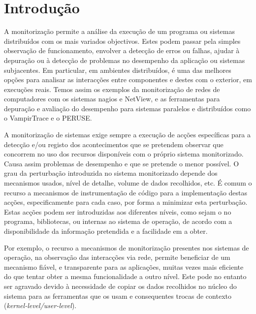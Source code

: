 \documentclass[a4paper]{llncs}
\begin{document}
\section{Introdução}
\label{sec:introduction}

A monitorização permite a análise da execução de um programa ou sistemas distribuídos com os mais variados objectivos. Estes podem passar pela simples observação de funcionamento, envolver a detecção de erros ou falhas, ajudar à depuração ou à detecção de problemas no desempenho da aplicação ou sistemas subjacentes. Em particular, em ambientes distribuídos, é uma das melhores opções para analisar as interacções entre componentes e destes com o exterior, em execuções reais. 
Temos assim os exemplos da monitorização de redes de computadores com os sistemas  nagios e NetView, e as ferramentas para depuração e avaliação do desempenho para sistemas paralelos e distribuídos como o VampirTrace e o PERUSE.




A monitorização de sistemas exige sempre a execução de acções específicas para a detecção e/ou registo dos acontecimentos que se pretendem observar que concorrem no uso dos recursos disponíveis com o próprio sistema monitorizado. Causa assim problemas de desempenho e que se pretende o menor possível. O grau da perturbação introduzida no sistema monitorizado depende dos mecanismos usados, nível de detalhe, volume de dados recolhidos, etc.  
É comum o recurso a mecanismos de instrumentação de código para a implementação destas acções, especificamente para cada caso, por forma a minimizar esta perturbação. Estas acções podem ser introduzidas aos diferentes níveis, como sejam o no programa, bibliotecas, ou internas ao sistema de operação, de acordo com a disponibilidade da informação pretendida e a facilidade em a obter.

Por exemplo, o recurso a mecanismos de monitorização presentes nos sistemas de operação, na observação das interacções via rede, permite beneficiar de um mecanismo fiável, e transparente para as aplicações, muitas vezes mais eficiente do que tentar obter a mesma funcionalidade a outro nível. Este pode no entanto ser agravado devido à necessidade de copiar os dados recolhidos no núcleo do sistema para as ferramentas que os usam e consequentes trocas de contexto (\emph{kernel-level/user-level}).
\end{document}
